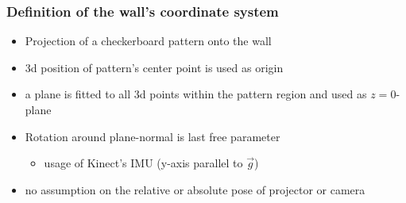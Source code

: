 \documentclass{beamer}
\begin{document}



\frame
{
  \frametitle{Definition of the wall's coordinate system}
		
  \begin{itemize}
  \item Projection of a checkerboard pattern onto the wall
  \item 3d position of pattern's center point is used as origin 
  \item a plane is fitted to all 3d points within the pattern region and used as $z=0$-plane 
  \item Rotation around plane-normal is last free parameter
  	\begin{itemize}
  	\item usage of Kinect's IMU (y-axis parallel to $\vec{g}$)
  	\end{itemize}
  \item no assumption on the relative or absolute pose of projector or camera
  \end{itemize}
}
\end{document}
